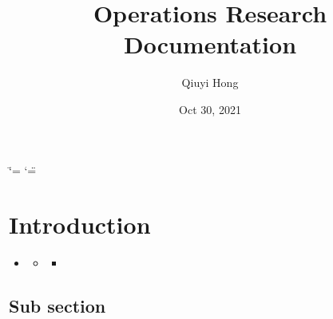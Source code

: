 \documentclass[letterpaper,10pt,english]{sphinxmanual}
\title{Operations Research Documentation}
\date{Oct 30, 2021}
\author{Qiuyi Hong}
\begin{document}
\ifdefined\shorthandoff
  \ifnum\catcode`\=\string=\active\shorthandoff{=}\fi
  \ifnum\catcode`\"=\active{}\fi
\fi

\pagestyle{empty}
\sphinxmaketitle
\pagestyle{plain}
\sphinxtableofcontents
\pagestyle{normal}
\label{\detokenize{index::doc}}



\chapter{Introduction}
\label{\detokenize{LinearAlgebra/Introduction:introduction}}\label{\detokenize{LinearAlgebra/Introduction::doc}}
\begin{sphinxShadowBox}
\begin{itemize}
\item {} 
\sphinxAtStartPar
{}\label{\detokenize{LinearAlgebra/Introduction:id1}}{\hyperref[\detokenize{LinearAlgebra/Introduction:introduction}]{}}
\begin{itemize}
\item {} 
\sphinxAtStartPar
{}\label{\detokenize{LinearAlgebra/Introduction:id2}}{\hyperref[\detokenize{LinearAlgebra/Introduction:sub-section}]{}}
\begin{itemize}
\item {} 
\sphinxAtStartPar
{}\label{\detokenize{LinearAlgebra/Introduction:id3}}{\hyperref[\detokenize{LinearAlgebra/Introduction:sub-subsection}]{}}

\end{itemize}

\end{itemize}

\end{itemize}
\end{sphinxShadowBox}


\section{Sub section}
\label{\detokenize{LinearAlgebra/Introduction:sub-section}}
\end{document}
